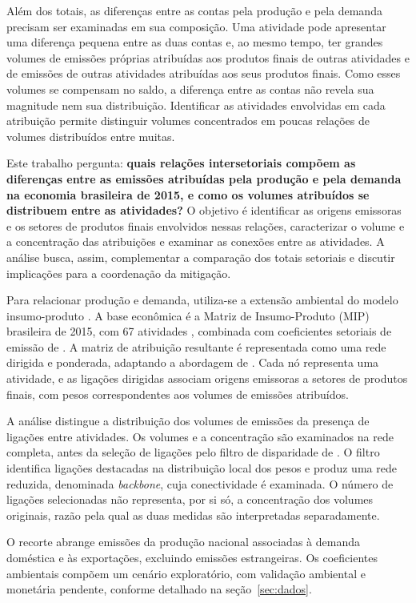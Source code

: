Além dos totais, as diferenças entre as contas pela produção e pela demanda precisam ser examinadas em sua composição. Uma atividade pode apresentar uma diferença pequena entre as duas contas e, ao mesmo tempo, ter grandes volumes de emissões próprias atribuídas aos produtos finais de outras atividades e de emissões de outras atividades atribuídas aos seus produtos finais. Como esses volumes se compensam no saldo, a diferença entre as contas não revela sua magnitude nem sua distribuição. Identificar as atividades envolvidas em cada atribuição permite distinguir volumes concentrados em poucas relações de volumes distribuídos entre muitas.

Este trabalho pergunta: \textbf{quais relações intersetoriais compõem as diferenças entre as emissões atribuídas pela produção e pela demanda na economia brasileira de 2015, e como os volumes atribuídos se distribuem entre as atividades?} O objetivo é identificar as origens emissoras e os setores de produtos finais envolvidos nessas relações, caracterizar o volume e a concentração das atribuições e examinar as conexões entre as atividades. A análise busca, assim, complementar a comparação dos totais setoriais e discutir implicações para a coordenação da mitigação.

Para relacionar produção e demanda, utiliza-se a extensão ambiental do modelo insumo-produto \parencite{millerBlair2009}. A base econômica é a Matriz de Insumo-Produto (MIP) brasileira de 2015, com 67 atividades \parencite{ibge2015mip}, combinada com coeficientes setoriais de emissão de \textcite{sanguinetAzzoni2024}. A matriz de atribuição resultante é representada como uma rede dirigida e ponderada, adaptando a abordagem de \textcite{huang2019}. Cada nó representa uma atividade, e as ligações dirigidas associam origens emissoras a setores de produtos finais, com pesos correspondentes aos volumes de emissões atribuídos.

A análise distingue a distribuição dos volumes de emissões da presença de ligações entre atividades. Os volumes e a concentração são examinados na rede completa, antes da seleção de ligações pelo filtro de disparidade de \textcite{serrano2009}. O filtro identifica ligações destacadas na distribuição local dos pesos e produz uma rede reduzida, denominada \textit{backbone}, cuja conectividade é examinada. O número de ligações selecionadas não representa, por si só, a concentração dos volumes originais, razão pela qual as duas medidas são interpretadas separadamente.

O recorte abrange emissões da produção nacional associadas à demanda doméstica e às exportações, excluindo emissões estrangeiras. Os coeficientes ambientais compõem um cenário exploratório, com validação ambiental e monetária pendente, conforme detalhado na seção~\ref{sec:dados}.

